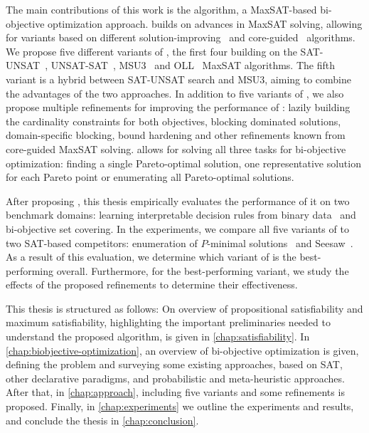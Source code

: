 The main contributions of this work is the \algname{} algorithm, a MaxSAT-based bi-objective optimization approach.
\algname{} builds on advances in MaxSAT solving, allowing for variants based on different solution-improving~\autocites{handbook2-maxsat,DBLP:journals/jsat/BerreP10,DBLP:journals/jsat/EenS06} and core-guided~\autocites{DBLP:journals/corr/abs-0712-1097,DBLP:conf/sat/AnsoteguiBL09,DBLP:conf/cp/MorgadoDM14,DBLP:journals/jsat/IgnatievMM19} algorithms.
We propose five different variants of \algname{}, the first four building on the SAT-UNSAT~\autocite{DBLP:journals/jsat/BerreP10}, UNSAT-SAT~\autocite{}, MSU3~\autocite{DBLP:journals/corr/abs-0712-1097} and OLL~\autocite{DBLP:conf/cp/MorgadoDM14} MaxSAT algorithms.
The fifth variant is a hybrid between SAT-UNSAT search and MSU3, aiming to combine the advantages of the two approaches.
In addition to five variants of \algname{}, we also propose multiple refinements for improving the performance of \algname{}:
lazily building the cardinality constraints for both objectives, blocking dominated solutions, domain-specific blocking, bound hardening and other refinements known from core-guided MaxSAT solving.
\algname{} allows for solving all three tasks for bi-objective optimization:
finding a single Pareto-optimal solution, one representative solution for each Pareto point or enumerating all Pareto-optimal solutions.

After proposing \algname{}, this thesis empirically evaluates the performance of it on two benchmark domains:
learning interpretable decision rules from binary data~\autocite{DBLP:conf/cp/MaliotovM18} and bi-objective set covering.
In the experiments, we compare all five variants of \algname{} to two SAT-based competitors:
enumeration of $P$-minimal solutions~\autocite{DBLP:conf/cp/SohBTB17} and Seesaw~\autocite{DBLP:conf/cp/JanotaMSM21}.
As a result of this evaluation, we determine which variant of \algname{} is the best-performing overall.
Furthermore, for the best-performing variant, we study the effects of the proposed refinements to determine their effectiveness.

This thesis is structured as follows:
On overview of propositional satisfiability and maximum satisfiability, highlighting the important preliminaries needed to understand the proposed algorithm, is given in \cref{chap:satisfiability}.
In \cref{chap:biobjective-optimization}, an overview of bi-objective optimization is given, defining the problem and surveying some existing approaches, based on SAT, other declarative paradigms, and probabilistic and meta-heuristic approaches.
After that, in \cref{chap:approach}, \algname{} including five variants and some refinements is proposed.
Finally, in \cref{chap:experiments} we outline the experiments and results, and conclude the thesis in \cref{chap:conclusion}.